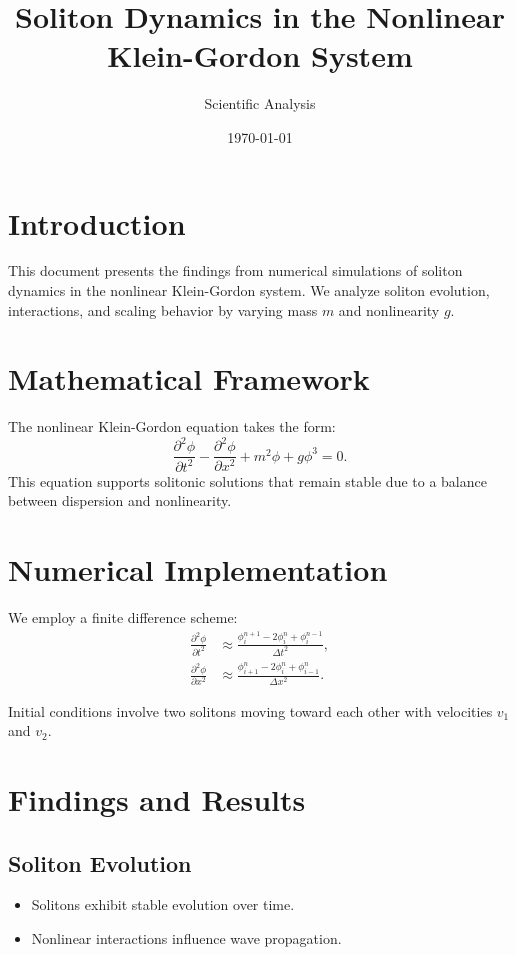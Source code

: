 \documentclass{article}
\title{Soliton Dynamics in the Nonlinear Klein-Gordon System}
\author{Scientific Analysis}
\date{\today}
\begin{document}
\maketitle

\section{Introduction}
This document presents the findings from numerical simulations of soliton dynamics in the nonlinear Klein-Gordon system. We analyze soliton evolution, interactions, and scaling behavior by varying mass \( m \) and nonlinearity \( g \).

\section{Mathematical Framework}
The nonlinear Klein-Gordon equation takes the form:
\begin{equation}
    \frac{\partial^2 \phi}{\partial t^2} - \frac{\partial^2 \phi}{\partial x^2} + m^2 \phi + g \phi^3 = 0.
\end{equation}
This equation supports solitonic solutions that remain stable due to a balance between dispersion and nonlinearity.

\section{Numerical Implementation}
We employ a finite difference scheme:
\begin{align}
    \frac{\partial^2 \phi}{\partial t^2} &\approx \frac{\phi^{n+1}_i - 2\phi^n_i + \phi^{n-1}_i}{\Delta t^2}, \\
    \frac{\partial^2 \phi}{\partial x^2} &\approx \frac{\phi^n_{i+1} - 2\phi^n_i + \phi^n_{i-1}}{\Delta x^2}.
\end{align}

Initial conditions involve two solitons moving toward each other with velocities \( v_1 \) and \( v_2 \).

\section{Findings and Results}

\subsection{Soliton Evolution}
\begin{itemize}
    \item Solitons exhibit stable evolution over time.
    \item Nonlinear interactions influence wave propagation.
\end{itemize}
\end{document}
